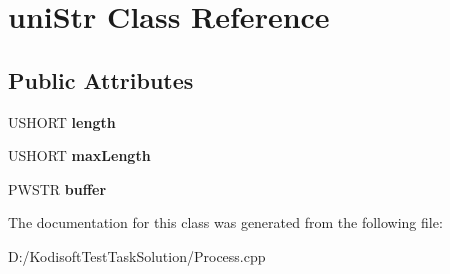 \hypertarget{classuni_str}{\section{uni\+Str Class Reference}
\label{classuni_str}
}
\subsection*{Public Attributes}
\begin{DoxyCompactItemize}
\item 
\hypertarget{classuni_str_a655d708196b4f680ecccd81d1fd7f071}{U\+S\+H\+O\+R\+T {\bfseries length}}\label{classuni_str_a655d708196b4f680ecccd81d1fd7f071}

\item 
\hypertarget{classuni_str_a799774e56b34399aed2d7572333e1a5a}{U\+S\+H\+O\+R\+T {\bfseries max\+Length}}\label{classuni_str_a799774e56b34399aed2d7572333e1a5a}

\item 
\hypertarget{classuni_str_a968519dcbfd99329ed585ec98a042e33}{P\+W\+S\+T\+R {\bfseries buffer}}\label{classuni_str_a968519dcbfd99329ed585ec98a042e33}

\end{DoxyCompactItemize}


The documentation for this class was generated from the following file\+:\begin{DoxyCompactItemize}
\item 
D\+:/\+Kodisoft\+Test\+Task\+Solution/Process.\+cpp\end{DoxyCompactItemize}
